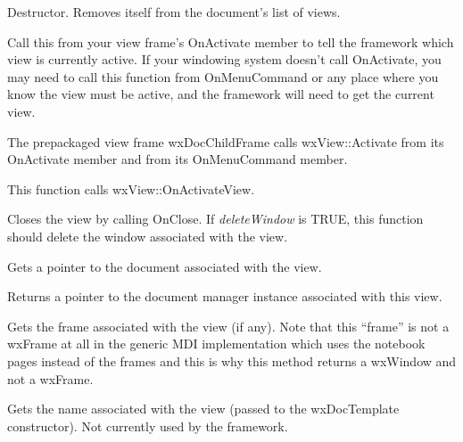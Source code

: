 Destructor. Removes itself from the document's list of views.



Call this from your view frame's OnActivate member to tell the framework which view is
currently active. If your windowing system doesn't call OnActivate, you may need to
call this function from OnMenuCommand or any place where you know the view must
be active, and the framework will need to get the current view.

The prepackaged view frame wxDocChildFrame calls wxView::Activate from its OnActivate member
and from its OnMenuCommand member.

This function calls wxView::OnActivateView.



Closes the view by calling OnClose. If {\it deleteWindow} is TRUE, this function should
delete the window associated with the view.



Gets a pointer to the document associated with the view.



Returns a pointer to the document manager instance associated with this view.

\label{wxviewgetframe}


Gets the frame associated with the view (if any). Note that this ``frame'' is
not a wxFrame at all in the generic MDI implementation which uses the notebook
pages instead of the frames and this is why this method returns a wxWindow and
not a wxFrame.



Gets the name associated with the view (passed to the wxDocTemplate constructor).
Not currently used by the framework.


